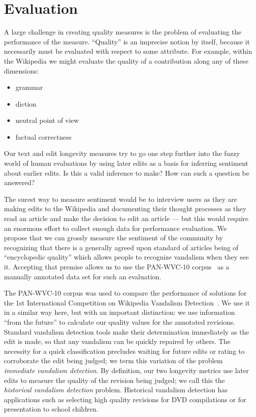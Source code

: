 \section{Evaluation}

A large challenge in creating quality measures is the
problem of evaluating the performance of the measure.
``Quality'' is an imprecise notion by itself, because it
necessarily must be evaluated with respect to some attribute.
For example, within the Wikipedia we might evaluate the quality
of a contribution along any of these dimensions:
\begin{itemize}
\item grammar
\item diction
\item neutral point of view
\item factual correctness
\end{itemize}
Our text and edit longevity measures try to go one step
further into the fuzzy world of human evaluations by using
later edits as a basis for inferring sentiment about earlier edits.
Is this a valid inference to make?
How can such a question be answered?

The surest way to measure sentiment would be to interview
users as they are making edits to the Wikipedia and documenting
their thought processes as they read an article and make the
decision to edit an article --- but this would require an enormous
effort to collect enough data for performance evaluation.
We propose that we can grossly measure the sentiment of the
community by recognizing that there is a generally agreed upon
standard of articles being of ``encyclopedic quality''
which allows people to recognize vandalism when they see it.
Accepting that premise allows us to use the PAN-WVC-10
corpus~\cite{Potthast2010a} as a manually annotated data set for
such an evaluation.

The PAN-WVC-10 corpus was used to compare the performance of
solutions for the 1st International Competition on Wikipedia
Vandalism Detection~\cite{Potthast2010b}.
We use it in a similar way here, but with an important distinction:
we use information ``from the future'' to calculate our
quality values for the annotated revisions.
Standard vandalism detection tools make their determination
immediately as the edit is made, so that any vandalism can be
quickly repaired by others.
The necessity for a quick classification precludes waiting
for future edits or rating to corroborate the edit being judged;
we term this variation of the problem \textit{immediate vandalism detection}.
By definition, our two longevity metrics use later edits to
measure the quality of the revision being judged; we call
this the \textit{historical vandalism detection} problem.
Historical vandalism detection has applications such as selecting
high quality revisions for DVD compilations or for presentation
to school children.

